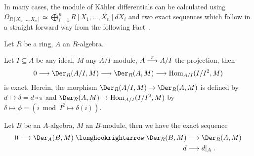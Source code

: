 \documentclass[a4paper,parskip=half,numbers=enddot, DIV=12]{scrreprt}
\begin{document}
In many cases, the module of Kähler differentials can be calculated using $\Omega_{R[X_1,\ldots,X_n]}\simeq \bigoplus_{i=1}^n R[X_1,\ldots, X_n] dX_i$ and two exact sequences which follow in a straight forward way from the following Fact~.
\begin{fact}
    Let $R$ be a ring, $A$ an $R$-algebra.
    \begin{alphanumerate}
        \item 
            Let $I\subseteq A$ be any ideal, $M$ any $A/I$-module, $A\morphism[\pi]A/I$ the projection, then 
            \begin{align}\lbl{eq:derExactSequence1}
                0\morphism \Der_R(A/I,M) \morphism \Der_R(A,M) \morphism \Hom_{A/I}(I/I^2, M) 
            \end{align}
            is exact. Herein, the morphism $\Der_R(A/I,M) \morphism \Der_R(A,M)$ is defined by $d\mapsto \delta=d\circ\pi$ and $\Der_R(A,M) \morphism \Hom_{A/I}(I/I^2, M)$ by $\delta\mapsto\phi = \left(i\bmod I^2\mapsto\delta(i)\right)$.
        \item 
            Let $B$ be an $A$-algebra, $M$ an $B$-module, then we have the exact sequence
            \begin{align}\lbl{eq:derExactSequence2}
	            \begin{split}
		            0 \morphism \Der_A(B,M) \monomorphism\Der_R(B,M) &\morphism \Der_R(A,M)\\
		            d&\longmapsto d|_A\;.
	            \end{split}
            \end{align}
    \end{alphanumerate}
\end{fact}
\end{document}
